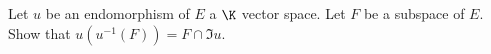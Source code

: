 Let $u$ be an endomorphism of $E$ a $\K$ vector space. Let $F$ be a subspace of $E$.
Show that $u(u^{-1}(F)) = F \cap \Im u$.